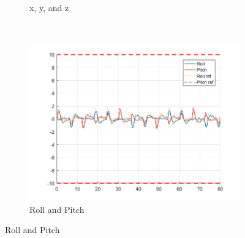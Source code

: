 \documentclass[11pt]{article}
\begin{document}
\begin{enumerate}
\begin{figure}[ht]
\begin{subfigure}[c]{0.3\linewidth}
            \caption{x, y, and z}
        \end{subfigure}
        ~
        \begin{subfigure}[c]{0.3\linewidth}
            \centering
            \includegraphics[width=\linewidth]{Plots_12_NonlinearModel_Hexagon/03}
            \caption{Roll and Pitch}
        \end{subfigure}
        

\end{figure}
\end{enumerate}
\end{document}
